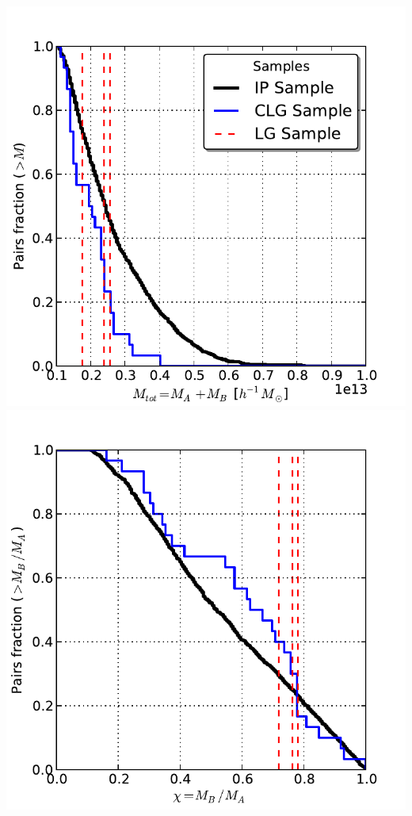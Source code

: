 \documentclass[usenatbib]{latex/mn2e}
\begin{document}
\begin{flushleft}
\begin{center}

\includegraphics[keepaspectratio=true,width=0.3\textheight]
{./figures/IP_IMF.pdf}
\includegraphics[keepaspectratio=true,width=0.3\textheight]
{./figures/IP_Mass_Ratio.pdf}


\label{fig:Index_Pairs}
\vspace{0.1 cm}
\end{center}
\end{flushleft}
\end{document}
